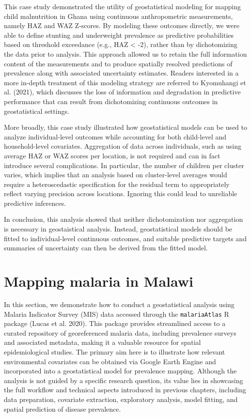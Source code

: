 \documentclass[
  letterpaper,
]{krantz}
\begin{document}
This case study demonstrated the utility of geostatistical modeling for
mapping child malnutrition in Ghana using continuous anthropometric
measurements, namely HAZ and WAZ Z-scores. By modeling these outcomes
directly, we were able to define stunting and underweight prevalence as
predictive probabilities based on threshold exceedance (e.g., HAZ
\textless{} -2), rather than by dichotomizing the data prior to
analysis. This approach allowed us to retain the full information
content of the measurements and to produce spatially resolved
predictions of prevalence along with associated uncertainty estimates.
Readers interested in a more in-depth treatment of this modeling
strategy are referred to Kyomuhangi et al. (2021), which discusses the
loss of information and degradation in predictive performance that can
result from dichotomizing continuous outcomes in geostatistical
settings.

More broadly, this case study illustrated how geostatistical models can
be used to analyze individual-level outcomes while accounting for both
child-level and household-level covariates. Aggregation of data across
individuals, such as using average HAZ or WAZ scores per location, is
not required and can in fact introduce several complications. In
particular, the number of children per cluster varies, which implies
that an analysis based on cluster-level averages would require a
heteroscedastic specification for the residual term to appropriately
reflect varying precision across locations. Ignoring this could lead to
unreliable predictive inferences.

In conclusion, this analysis showed that neither dichotomization nor
aggregation is necessary in geostaistical analysis. Instead,
geostatistical models should be fitted to individual-level continuous
outcomes, and suitable predictive targets and summaries of uncertainty
can then be derived from the fitted model.

\section{Mapping malaria in Malawi}\label{mapping-malaria-in-malawi}

In this section, we demonstrate how to conduct a geostatistical analysis
using Malaria Indicator Survey (MIS) data accessed through the
\texttt{malariaAtlas} R package (Lucas et al. 2020). This package
provides streamlined access to a curated repository of georeferenced
malaria data, including prevalence surveys and associated metadata,
making it a valuable resource for spatial epidemiological studies. The
primary aim here is to illustrate how relevant environmental covariates
can be obtained via Google Earth Engine and incorporated into a
geostatistical model for prevalence mapping. Although the analysis is
not guided by a specific research question, its value lies in showcasing
the full workflow and technical aspects introduced in previous chapters,
including data preparation, covariate extraction, exploratory analysis,
model fitting, and spatial prediction of disease prevalence.
\end{document}
